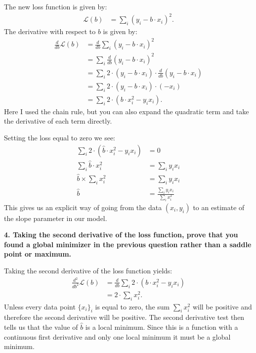 \documentclass[12pt,hidelinks]{article}
\numberwithin{equation}{section}
\begin{document}
\vspace*{12pt}

The new loss function is given by:
\begin{align*}
\mathcal{L}(b) &= \sum_i \left( y_i - b \cdot x_i \right)^2.
\end{align*}
The derivative with respect to $b$ is given by:
\begin{align*}
\frac{d}{db} \mathcal{L}(b) &= \frac{d}{db} \sum_i \left( y_i - b \cdot x_i \right)^2 \\
&= \sum_i \frac{d}{db} \left( y_i - b \cdot x_i \right)^2 \\
&= \sum_i 2 \cdot \left( y_i - b \cdot x_i \right) \cdot \frac{d}{db} \left( y_i - b \cdot x_i  \right) \\
&= \sum_i 2 \cdot \left( y_i - b \cdot x_i \right) \cdot \left( - x_i  \right) \\
&= \sum_i 2 \cdot \left( b \cdot x_i^2  - y_i x_i \right).
\end{align*}
Here I used the chain rule, but you can also expand the quadratic term and take
the derivative of each term directly.

Setting the loss equal to zero we see:
\begin{align*}
\sum_i 2 \cdot \left( \widehat{b} \cdot x_i^2 - y_i x_i \right) &= 0 \\
\sum_i \widehat{b} \cdot x_i^2 &= \sum_i y_i x_i \\
\widehat{b} \times \sum_i x_i^2 &= \sum_i y_i x_i \\
\widehat{b} &= \frac{\sum_i y_i x_i}{\sum_i x_i^2}
\end{align*}
This gives us an explicit way of going from the data $(x_i, y_i)$ to an
estimate of the slope parameter in our model.

\vspace*{12pt}

\textbf{4. Taking the second derivative of the loss function, prove that you found
a global minimizer in the previous question rather than a saddle point or
maximum.}

\vspace*{12pt}

Taking the second derivative of the loss function yields:
\begin{align*}
\frac{d^2}{db^2} \mathcal{L}(b) &= \frac{d}{db} \sum_i 2 \cdot \left(b \cdot x_i^2  - y_i x_i  \right) \\
&= 2 \cdot \sum_i  x_i^2.
\end{align*}
Unless every data point $\{x_i\}_i$ is equal to zero, the sum $\sum_i x_i^2$
will be positive and therefore the second derivative will be positive. The
second derivative test then tells us that the value of $\widehat{b}$ is a
local minimum. Since this is a function with a continuous first derivative
and only one local minimum it must be a global minimum.
\end{document}
